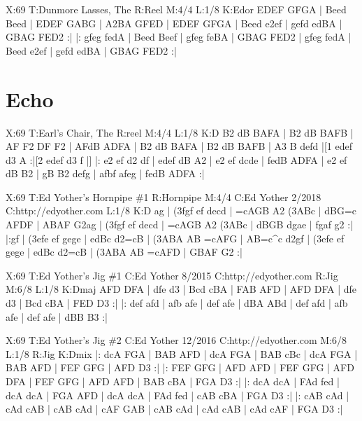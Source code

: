 \documentclass[letterpaper]{article}
\begin{document}
\begin{abc}[name]
X:69
T:Dunmore Lasses, The
R:Reel
M:4/4
L:1/8
K:Edor
EDEF GFGA | Beed Beed | EDEF GABG | A2BA GFED |
EDEF GFGA | Beed e2ef | gefd edBA | GBAG FED2 :|
|: gfeg fedA | Beed Beef | gfeg feBA | GBAG FED2 |
gfeg fedA | Beed e2ef | gefd edBA | GBAG FED2 :|
\end{abc}

\section{Echo}

\begin{abc}[name]
X:69
T:Earl's Chair, The
R:reel
M:4/4
L:1/8
K:D
B2 dB BAFA | B2 dB BAFB | AF F2 DF F2 | AFdB ADFA |
B2 dB BAFA | B2 dB BAFB | A3 B defd |[1 edef d3 A :|[2 edef d3 f |]
|: e2 ef d2 df | edef dB A2 | e2 ef dcde | fedB ADFA |
e2 ef dB B2 | gB B2 defg | afbf afeg | fedB ADFA :|
\end{abc}

\begin{abc}[name]
X:69
T:Ed Yother's Hornpipe \#1
R:Hornpipe
M:4/4
C:Ed Yother 2/2018
C:http://edyother.com
L:1/8
K:D
ag | (3fgf ef decd | =cAGB A2 (3ABc | dBG=c AFDF | ABAF G2ag |
(3fgf ef decd | =cAGB A2 (3ABc | dBGB dgae | fgaf g2 :|
|:gf | (3efe ef gege | edBc d2=cB | (3ABA AB =cAFG | AB=c^c d2gf |
(3efe ef gege | edBc d2=cB | (3ABA AB =cAFD | GBAF G2 :|
\end{abc}

\begin{abc}[name]
X:69
T:Ed Yother's Jig \#1
C:Ed Yother 8/2015
C:http://edyother.com
R:Jig
M:6/8
L:1/8
K:Dmaj
AFD DFA | dfe d3 | Bcd cBA | FAB AFD | 
AFD DFA | dfe d3 | Bcd cBA | FED D3 :|
|: def afd | afb afe | def afe | dBA ABd | 
def afd | afb afe | def afe | dBB B3 :|
\end{abc}

\begin{abc}[name]
X:69
T:Ed Yother's Jig \#2
C:Ed Yother 12/2016
C:http://edyother.com
M:6/8
L:1/8
R:Jig
K:Dmix
|: dcA FGA | BAB AFD | dcA FGA | BAB cBc | 
dcA FGA | BAB AFD | FEF GFG | AFD D3 :|
|: FEF GFG | AFD AFD | FEF GFG | AFD DFA | 
FEF GFG | AFD AFD | BAB cBA | FGA D3 :| 
|: dcA dcA | FAd fed | dcA dcA | FGA AFD | 
dcA dcA | FAd fed | cAB cBA | FGA D3 :|
|: cAB cAd | cAd cAB | cAB cAd | cAF GAB | 
cAB cAd | cAd cAB | cAd cAF | FGA D3 :| 
\end{abc}
\end{document}
